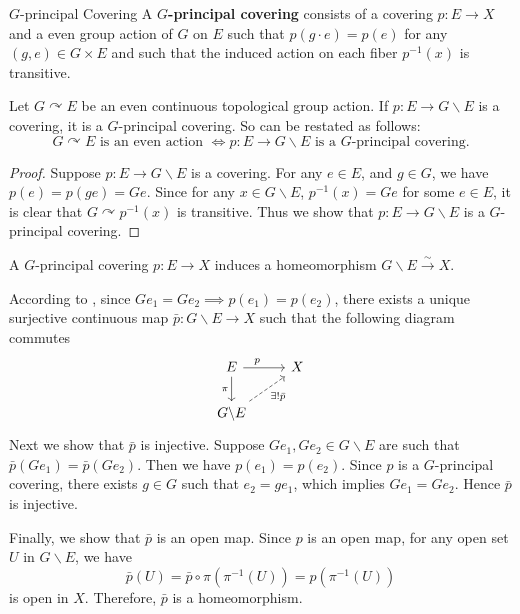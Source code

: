 \documentclass{report}
\def\acts{\curvearrowright}
\begin{document}
\begin{definition}{$G$-principal Covering}{}
	A \textbf{$G$-principal covering} consists of a covering $p: E \rightarrow X$ and a even group action of $G$ on $E$ such that $p(g \cdot e)=p(e)$ for any $(g, e) \in G \times E$ and such that the induced action on each fiber $p^{-1}(x)$ is transitive.
\end{definition}
\begin{proposition}{}{}
	Let $G\acts E$ be an even continuous topological group action. If $p: E\to G\backslash E$ is a covering, it is a $G$-principal covering. So  can be restated as follows:
	\[ 
	G \acts E\text{ is an even action }\iff p: E\to G\backslash E \text{ is a $G$-principal covering}.
	\]
\end{proposition}
\begin{proof}
	Suppose $p: E\to G\backslash E$ is a covering. For any $e\in E$, and $g\in G$, we have $p(e)=p(ge)=Ge$. Since for any $x\in G \backslash E$, $p^{-1}(x)=Ge$ for some $e\in E$, it is clear that $G \acts p^{-1}(x)$ is transitive. Thus we show that $p: E\to G\backslash E$ is a $G$-principal covering.
\end{proof}


\begin{proposition}{}{}
	A $G$-principal covering $p: E \rightarrow X$ induces a homeomorphism $G \backslash E \xrightarrow{\sim} X$.
\end{proposition}
\begin{prf}
	According to , since $Ge_1=Ge_2 \implies p(e_1)=p(e_2)$, there exists a unique surjective continuous map $\bar{p}: G\backslash E \to X$ such that the following diagram commutes
	\[
	\begin{tikzcd}
		E \arrow[r, "p\quad"] \arrow[d, "\pi"'] & X \\
		G\backslash E \arrow[ru, dashed, "\exists!\bar{p}"']
	\end{tikzcd}
	\]
	Next we show that $\bar{p}$ is injective. Suppose $Ge_1,Ge_2\in G\backslash E$ are such that $\bar{p}(Ge_1)=\bar{p}(G e_2)$. Then we have $p(e_1)=p(e_2)$. Since $p$ is a $G$-principal covering, there exists $g\in G$ such that $e_2=ge_1$, which implies $Ge_1=Ge_2$. Hence $\bar{p}$ is injective. 

	Finally, we show that $\bar{p}$ is an open map. Since $p$ is an open map, for any open set $U$ in $G\backslash E$, we have 
	\[ 
		\bar{p}(U)=\bar{p}\circ \pi\left(\pi^{-1}(U)\right)=p\left(\pi^{-1}(U)\right)
	\]
	is open in $X$. Therefore, $\bar{p}$ is a homeomorphism.
\end{prf}
\end{document}
